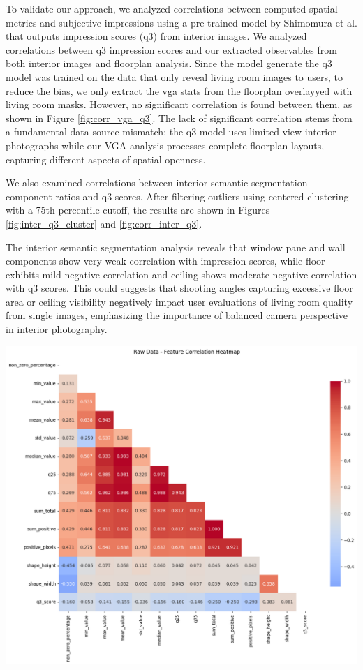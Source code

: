\documentclass[11pt,a4paper]{article}
\begin{document}
\begin{multicols}{2}
To validate our approach, we analyzed correlations between computed spatial metrics and subjective impressions 
using a pre-trained model by Shimomura et al. that outputs impression scores (q3) from interior images.
We analyzed correlations between q3 impression scores and our extracted observables from both interior images 
and floorplan analysis. Since the model generate the q3 model was trained on the data that only reveal living room
images to users, to reduce the bias, we only extract the vga stats from the floorplan overlayyed with living room
masks. However, no significant correlation is found between them, as shown in Figure \ref{fig:corr_vga_q3}.
The lack of significant correlation stems from a fundamental data source mismatch: the q3 model uses limited-view interior photographs while our VGA analysis processes complete floorplan layouts, capturing different aspects of spatial openness.

We also examined correlations between interior semantic segmentation component ratios and q3 scores. 
After filtering outliers using centered clustering with a 75th percentile cutoff, the results are shown 
in Figures \ref{fig:inter_q3_cluster} and \ref{fig:corr_inter_q3}.

The interior semantic segmentation analysis reveals that window pane and wall components show very weak 
correlation with impression scores, while floor exhibits mild negative correlation and ceiling shows 
moderate negative correlation with q3 scores. This could suggests that shooting angles capturing excessive 
floor area or ceiling visibility negatively impact user evaluations of living room quality 
from single images, emphasizing the importance of balanced camera perspective in interior photography.

\begin{flushleft}
    \includegraphics[width=0.9\columnwidth]{plots/corr_vga_q3.png}
    \label{fig:corr_vga_q3}
\end{flushleft}


\end{multicols}
\end{document}
